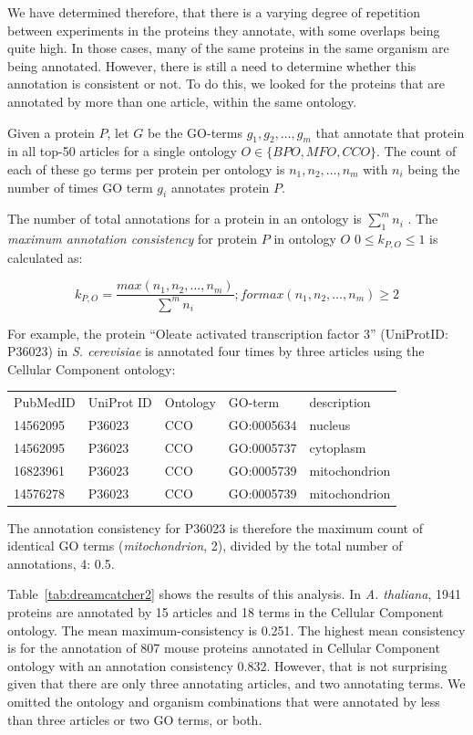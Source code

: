 \documentclass[12pt]{article}
\begin{document}
We have determined therefore, that there is a varying degree of repetition between
experiments in the proteins they annotate, with some overlaps being quite high. In those
cases, many of the same proteins in the same organism are being annotated. However, there
is still a need to determine whether this annotation is consistent or not. To do this, we
looked for the proteins that are annotated by more than one article, within the same
ontology.

Given a protein $P$, let $G$ be the GO-terms $g_1,g_2,\dots,g_m$ that annotate that protein
in all top-50 articles for a single ontology $O \in \{BPO,MFO,CCO\}$. The count of each of these
go terms per protein per ontology is $n_1,n_2,\dots,n_m$ with $n_i$ being the number of
times GO term $g_i$ annotates protein $P$.

The number of total annotations for a protein in an ontology is $\sum_1^m n_i$ . The
\textit{maximum annotation consistency} for protein $P$ in ontology $O$ $0 \leq k_{P,O}
\leq 1$ is calculated as:

\[
k_{P,O} = \frac{max(n_1,n_2,\dots,n_m)}{\sum^m n_i}; for max(n_1,n_2,\dots,n_m) \geq 2
\]


For example, the protein ``Oleate activated transcription factor 3'' (UniProtID: P36023) in \textit{S.
cerevisiae} is annotated four times by three articles using the Cellular Component ontology:

\begin{table}
\begin{tabular}{l l l l l}
PubMedID  &  UniProt ID& Ontology & GO-term & description \\
14562095  &  P36023    & CCO & GO:0005634  &   nucleus \\
14562095  &  P36023    & CCO  &  GO:0005737 &  cytoplasm \\
16823961  &  P36023    & CCO  & GO:0005739  &    mitochondrion \\
14576278  &  P36023    & CCO  & GO:0005739  &    mitochondrion \\
\end{tabular}
\end{table}

The annotation consistency for P36023 is therefore the maximum count of identical GO terms
(\textit{mitochondrion}, 2), divided by the total number of annotations, 4: 0.5.

Table~\ref{tab:dreamcatcher2} shows the results of this analysis. In \textit{A. thaliana},
1941 proteins are annotated by 15 articles and 18 terms in the Cellular Component ontology.
The mean maximum-consistency is 0.251. The highest mean consistency is for the annotation
of 807 mouse proteins annotated in Cellular Component ontology with an annotation
consistency 0.832. However, that is not surprising given that there are only three
annotating articles, and two annotating terms. We omitted the ontology and organism
combinations that were annotated by less than three articles or two GO terms, or both.
\end{document}
